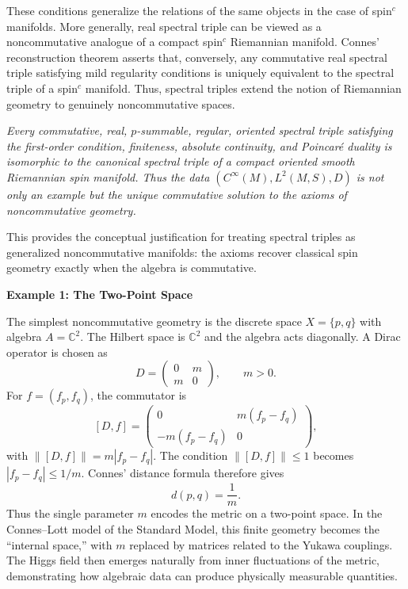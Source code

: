 \documentclass[11pt]{article}
\theoremstyle{plain}
\begin{document}
These conditions generalize the relations of the same objects in the case of spin$^c$ manifolds. More generally, real spectral triple can be viewed as a noncommutative analogue of a
compact spin$^c$ Riemannian manifold. Connes' reconstruction theorem  asserts that, conversely, any
commutative real spectral triple satisfying mild regularity conditions is uniquely
equivalent to the spectral triple of a spin$^c$ manifold.  Thus, spectral triples
extend the notion of Riemannian geometry to genuinely noncommutative spaces.


\medskip 

 {\it Every commutative, real, $p$-summable, regular, oriented spectral triple satisfying the first-order
condition, finiteness, absolute continuity, and Poincaré duality is isomorphic to the canonical
spectral triple of a compact oriented smooth Riemannian spin manifold.  Thus the data
$(C^{\infty}(M),L^{2}(M,S),D)$ is not only an example but the \emph{unique} commutative solution to
the axioms of noncommutative geometry.}


\medskip

This provides the conceptual justification for treating spectral triples as generalized noncommutative
manifolds: the axioms recover classical spin geometry exactly when the algebra is commutative.

\bigskip
\noindent\textbf{Example 1: The Two-Point Space }

\medskip
The simplest noncommutative geometry is the discrete space $X=\{p,q\}$ with algebra
$A=\mathbb{C}^{2}$.  The Hilbert space is $\mathbb{C}^{2}$ and the algebra acts diagonally.  A Dirac
operator is chosen as
\[
D
  =
  \begin{pmatrix}
  0 & m \\
  m & 0
  \end{pmatrix},
  \qquad m>0.
\]
For $f=(f_{p},f_{q})$, the commutator is
\[
[D,f]
  =
  \begin{pmatrix}
  0 & m(f_{p}-f_{q}) \\
  -m(f_{p}-f_{q}) & 0
  \end{pmatrix},
\]
with $\|[D,f]\| = m |f_{p}-f_{q}|$. The condition $\|[D,f]\|\le 1$ becomes $|f_{p}-f_{q}| \le 1/m$.  Connes' distance formula therefore
gives
\[
d(p,q)=\frac{1}{m}.
\]
Thus the single parameter $m$ encodes the metric on a two-point space.  In the Connes--Lott model of
the Standard Model, this finite geometry becomes the ``internal space,'' with $m$ replaced by matrices
related to the Yukawa couplings.  The Higgs field then emerges naturally from inner fluctuations of
the metric, demonstrating how algebraic data can produce physically measurable quantities.
\end{document}
